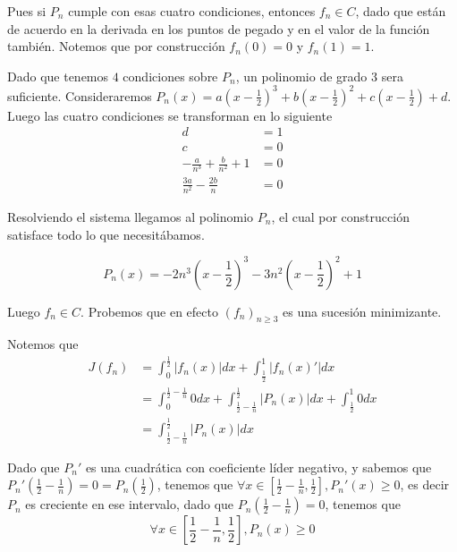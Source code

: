 \documentclass[a4paper,oneside,10.5pt]{USMArt}
\begin{document}
\begin{sol}
\begin{enumerate}
          Pues si $P_{n}$ cumple con esas cuatro condiciones, entonces $f_{n} \in C$, dado que están de acuerdo en la derivada en los puntos de pegado y en el valor de la función también. Notemos que por construcción $f_{n}(0) = 0$ y $f_{n}(1) = 1$.

          Dado que tenemos $4$ condiciones sobre $P_{n}$, un polinomio de grado $3$ sera suficiente. Consideraremos $P_{n}(x) = a(x - \frac12)^{3} + b(x - \frac12)^{2} + c(x - \frac12) + d$. Luego las cuatro condiciones se transforman en lo siguiente
          \begin{align*}
            d &= 1\\
            c &= 0\\
            -\frac{a}{n^{3}} + \frac{b}{n^{2}} + 1 &= 0\\
            \frac{3a}{n^{2}} - \frac{2b}{n} &= 0
          \end{align*}

          Resolviendo el sistema llegamos al polinomio $P_{n}$, el cual por construcción satisface todo lo que necesitábamos.

          \begin{equation*}
            P_{n}(x) = -2n^{3}(x - \frac12)^{3} - 3n^{2}(x - \frac12)^{2} + 1
          \end{equation*}

          Luego $f_{n} \in C$. Probemos que en efecto $(f_{n})_{n \geq 3}$ es una sucesión minimizante.

          Notemos que
          \begin{align*}
            J(f_{n}) &= \int_{0}^{\frac{1}{2}} |f_{n}(x)| dx + \int_{\frac12}^{1} |f_{n}(x)'|dx\\
                     &= \int_{0}^{\frac12 - \frac1n} 0 dx + \int_{\frac12 - \frac1n}^{\frac12} |P_{n}(x)| dx + \int_{\frac12}^{1} 0 dx\\
                     &= \int_{\frac12 - \frac1n}^{\frac12} |P_{n}(x)| dx
          \end{align*}

          Dado que $P_{n}'$ es una cuadrática con coeficiente líder negativo, y sabemos que $P_{n}'(\frac12 - \frac1n) = 0 = P_{n}(\frac12)$, tenemos que $\forall x \in [\frac12  - \frac1n, \frac12], P_{n}'(x) \geq 0$, es decir $P_{n}$ es creciente en ese intervalo, dado que $P_{n}(\frac12 - \frac1n) = 0$, tenemos que
          \begin{equation*}
            \forall x \in [\frac12 - \frac1n, \frac12], P_{n}(x) \geq 0
          \end{equation*}


\end{enumerate}
\end{sol}
\end{document}
